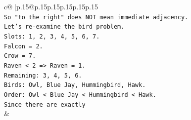 \documentclass{article}
\begin{document}
{\begin{supertabular}{c@{$\;$}|p{.15\linewidth}@{}p{.15\linewidth}p{.15\linewidth}p{.15\linewidth}p{.15\linewidth}p{.15\linewidth}}
{{{\\ 
\texttt{So "to the right" does NOT mean immediate adjacency.} \\
\texttt{Let's re{-}examine the bird problem.} \\
\texttt{Slots: 1, 2, 3, 4, 5, 6, 7.} \\
\texttt{Falcon = 2.} \\
\texttt{Crow = 7.} \\
\texttt{Raven < 2 => Raven = 1.} \\
\texttt{Remaining: 3, 4, 5, 6.} \\
\texttt{Birds: Owl, Blue Jay, Hummingbird, Hawk.} \\
\texttt{Order: Owl < Blue Jay < Hummingbird < Hawk.} \\
\texttt{Since there are exactly} \\
            }
        }
    }
    & \\ \\

\end{supertabular}
}
\end{document}
